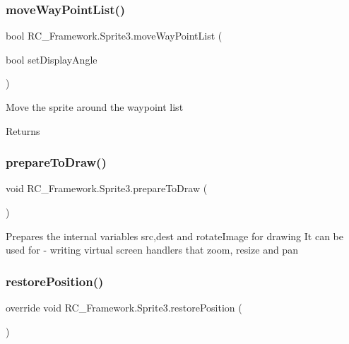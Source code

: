 \subsubsection{\texorpdfstring{move\+Way\+Point\+List()}{moveWayPointList()}}
{\footnotesize\ttfamily bool R\+C\+\_\+\+Framework.\+Sprite3.\+move\+Way\+Point\+List (\begin{DoxyParamCaption}\item[{bool}]{set\+Display\+Angle }\end{DoxyParamCaption})}



Move the sprite around the waypoint list 

\begin{DoxyReturn}{Returns}

\end{DoxyReturn}
\mbox{\label{class_r_c___framework_1_1_sprite3_afc737761beac47c71402bea9f5cc0b2a}} 
\subsubsection{\texorpdfstring{prepare\+To\+Draw()}{prepareToDraw()}}
{\footnotesize\ttfamily void R\+C\+\_\+\+Framework.\+Sprite3.\+prepare\+To\+Draw (\begin{DoxyParamCaption}{ }\end{DoxyParamCaption})}



Prepares the internal variables src,dest and rotate\+Image for drawing It can be used for -\/ writing virtual screen handlers that zoom, resize and pan 

\mbox{\label{class_r_c___framework_1_1_sprite3_a4ffc487d5c332dee276909dad3dba57a}} 
\subsubsection{\texorpdfstring{restore\+Position()}{restorePosition()}}
{\footnotesize\ttfamily override void R\+C\+\_\+\+Framework.\+Sprite3.\+restore\+Position (\begin{DoxyParamCaption}{ }\end{DoxyParamCaption})\hspace{0.3cm}{\ttfamily [virtual]}}



